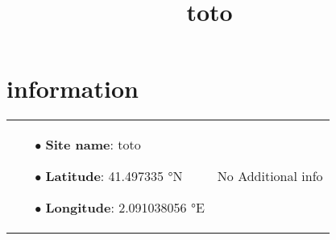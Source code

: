 \documentclass[a4paper,11pt, table]{article}
\begin{document}
\title{toto}
\author{}
\date{}

\maketitle


\thispagestyle{firststyle}

\vspace*{-1cm}

\section*{information}

\begin{tabular}{m{13cm}m{4cm}}
\begin{itemize}
\item[$\bullet$] \textbf{Site name}: toto
\item[$\bullet$] \textbf{Latitude}: 41.497335 °N
\item[$\bullet$] \textbf{Longitude}: 2.091038056 °E
\end{itemize}
&
No Additional info
\end{tabular}
\end{document}
